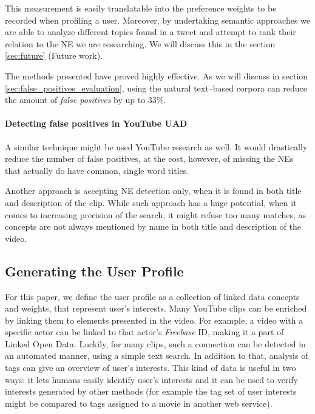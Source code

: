 This measurement is easily translatable into the preference weights to be recorded when profiling a user.
Moreover, by undertaking semantic approaches we are able to analyze different topics found in a tweet and
attempt to rank their relation to the NE we are researching. We will discuss this in the section \ref{sec:future}
(Future work).

The methods presented have proved highly effective. As we will discuss in section \ref{sec:false_positives_evaluation},
using the natural text--based corpora can reduce the amount of \textit{false positives} by up to 33\%.

\paragraph{Detecting false positives in YouTube UAD}

A similar technique might be used YouTube research as well. It would drastically
reduce the number of false positives, at the cost, however, of missing the NEs
that actually do have common, single word titles.

Another approach is accepting NE detection only, when it is found in both title
and description of the clip. While such approach has a huge potential, when it
comes to increasing precision of the search, it might refuse too many matches,
as concepts are not always mentioned by name in both title and description of
the video.

\subsection{Generating the User Profile}

For this paper, we define the user profile as a collection of linked data concepts and weights,
that represent user's interests. Many YouTube clips can be
enriched by linking them to elements presented in the video. For example, a
video with a specific actor can be linked to that actor's \textit{Freebase} ID, making it
a part of Linked Open Data. Luckily, for many clips, such a connection can be
detected in an automated manner, using a simple text search.
In addition to that, analysis of tags can give an overview of user's interests. This kind of data is
useful in two ways: it lets humans easily identify user's interests and it can be
used to verify interests generated by other methods (for example the tag set
of user interests might be compared to tags assigned to a movie in another web
service).

